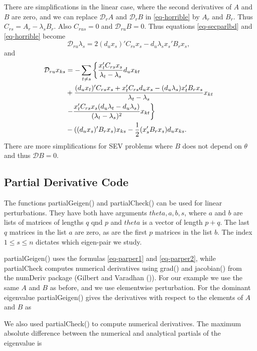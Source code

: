 \documentclass[
  12pt,
  letterpaper,
  DIV=11,
  numbers=noendperiod]{scrartcl}
\begin{document}
There are simplifications in the linear case, where the second
derivatives of \(A\) and \(B\) are zero, and we can replace
\(\mathcal{D}_rA\) and \(\mathcal{D}_rB\) in \eqref{eq-horrible} by
\(A_r\) and \(B_r\). Thus \(C_{rs}=A_r-\lambda_sB_r\). Also
\(C_{rus}=0\) and \(\mathcal{D}_{ru}B=0\). Thus equations
\eqref{eq-secparlbd} and \eqref{eq-horrible} become \begin{equation}
\mathcal{D}_{ru}\lambda_s=2(d_ux_s)'C_{rs}x_s-d_u\lambda_sx_s'B_rx_s,
\end{equation} and \begin{align}
\mathcal{D}_{ru}x_{ks}&=-\sum_{t\not= s}\left\{\frac{x_t'C_{rs}x_s}{\lambda_t-\lambda_s}d_ux_{kt}\right.\notag\\
&+\frac{(d_ux_t)'C_{rs}x_s+
x_t'C_{rs}d_ux_s-(d_u\lambda_s)x_t'B_rx_s}{\lambda_t-\lambda_s}x_{kt}\notag\\
&\left.-\frac{x_t'C_{rs}x_s(d_u\lambda_t-d_u\lambda_s)}{(\lambda_t-\lambda_s)^2}x_{kt}\right\}\notag\\
&-((d_ux_s)'B_rx_s)x_{ks}-\frac12(x_s'B_rx_s)d_ux_{ks}.
\end{align} There are more simplifications for SEV problems where \(B\)
does not depend on \(\theta\) and thus \(\mathcal{D}B=0\).

\subsection{Partial Derivative Code}\label{sec-partialcode}

The functions partialGeigen() and partialCheck() can be used for linear
perturbations. They have both have arguments \(theta, a, b, s\), where
\(a\) and \(b\) are lists of matrices of lengths \(q\) qnd \(p\) and
\(theta\) is a vector of length \(p+q\). The last \(q\) matrices in the
list \(a\) are zero, as are the first \(p\) matrices in the list \(b\).
The index \(1\leq s\leq n\) dictates which eigen-pair we study.

partialGeigen() uses the formulas \eqref{eq-parper1} and
\eqref{eq-parper2}, while partialCheck computes numerical derivatives
using grad() and jacobian() from the numDeriv package (Gilbert and
Varadhan ()). For our example we
use the same \(A\) and \(B\) as before, and we use elementwise
perturbation. For the dominant eigenvalue partialGeigen() gives the
derivatives with respect to the elements of \(A\) and \(B\) as

We also used partialCheck() to compute numerical derivatives. The
maximum absolute difference between the numerical and analytical
partials of the eigenvalue is
\end{document}
